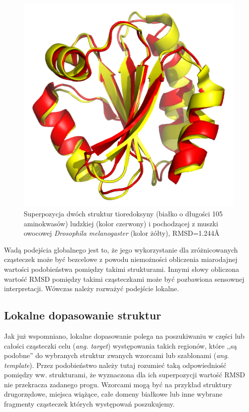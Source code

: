 \documentclass[licencjacka]{pracamgr}
\begin{document}
\begin{figure}[H]
\centering
\includegraphics[scale=0.7]{global_superposition}
\caption{Superpozycja dwóch struktur tioredoksyny (białko o długości 105 aminokwasów) ludzkiej (kolor czerwony) i pochodzącej z muszki owocowej \textit{Drosophila melanogaster} (kolor żółty), RMSD=1.244\AA }
\end{figure}

Wadą podejścia globalnego jest to, że jego wykorzystanie dla zróżnicowanych cząsteczek może być bezcelowe z powodu niemożności obliczenia miarodajnej wartości podobieństwa pomiędzy takimi strukturami. Innymi słowy obliczona wartość RMSD pomiędzy takimi cząsteczkami może być pozbawiona sensownej interpretacji. Wówczas należy rozważyć podejście lokalne.

\subsection{Lokalne dopasowanie struktur} 
Jak już wspomniano, lokalne dopasowanie polega na poszukiwaniu w części lub całości cząsteczki celu (\textit{ang. target}) występowania takich regionów, które ,,są podobne'' do wybranych struktur zwanych wzorcami lub szablonami (\textit{ang. template}). Przez podobieństwo należy tutaj rozumieć taką odpowiedniość pomiędzy ww. strukturami, że wyznaczona dla ich superpozycji wartość RMSD nie przekracza zadanego progu. Wzorcami mogą być na przykład struktury drugorzędowe, miejsca wiążące, całe domeny białkowe lub inne wybrane fragmenty cząsteczek których występowań poszukujemy.
\end{document}
